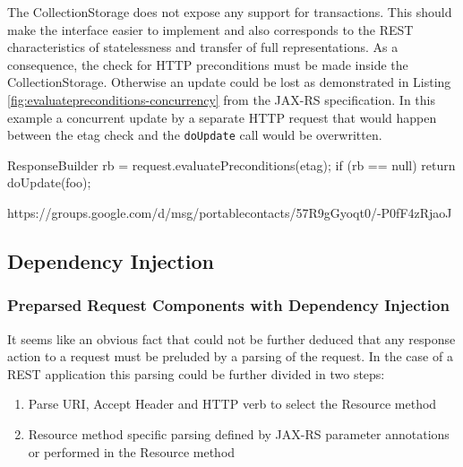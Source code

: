 \documentclass[11pt,a4paper,headsepline,twoside]{scrartcl}		%
\begin{document}
The CollectionStorage does not expose any support for transactions. This should
make the interface easier to implement and also corresponds to the REST
characteristics of statelessness and transfer of full representations. As a
consequence, the check for HTTP preconditions must be made inside the
CollectionStorage. Otherwise an update could be lost as demonstrated in Listing
\ref{fig:evaluatepreconditions-concurrency} from the JAX-RS
specification\cite[p. 28]{JAX-RS1.1}. In this example a concurrent update by a
separate HTTP request that would happen between the etag check and the
\lstinline:doUpdate: call would be overwritten.

\begin{javalisting}[label=fig:evaluatepreconditions-concurrency,
                   float=htb,
                   caption={Potential lost-update problem with JAX-RS}]
ResponseBuilder rb = request.evaluatePreconditions(etag);
if (rb == null) return doUpdate(foo);
\end{javalisting}



%
https://groups.google.com/d/msg/portablecontacts/57R9gGyoqt0/-P0fF4zRjaoJ

\subsection{Dependency Injection}
\label{sec:dependency-injection}


\subsubsection{Preparsed Request Components with Dependency Injection}
\label{sec:prep-requ-comp}

It seems like an obvious fact that could not be further deduced that any
response action to a request must be preluded by a parsing of the request. In
the case of a REST application this parsing could be further divided in two
steps:
\begin{enumerate}
\item Parse URI, Accept Header and HTTP verb to select the Resource method
\item Resource method specific parsing defined by JAX-RS parameter annotations
  or performed in the Resource method
\end{enumerate}
\end{document}
